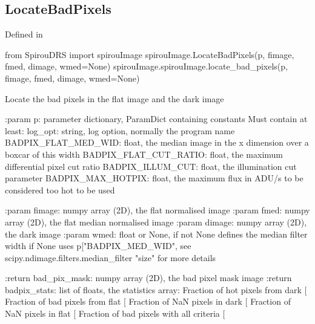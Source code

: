 \noindent\begin{minipage}{\textwidth}
\subsection{LocateBadPixels}

Defined in \spirouImage{}

\begin{pythonbox}
from SpirouDRS import spirouImage
spirouImage.LocateBadPixels(p, fimage, fmed, dimage, wmed=None)
spirouImage.spirouImage.locate_bad_pixels(p, fimage, fmed, dimage, wmed=None)
\end{pythonbox}

\begin{pythondocstring}
Locate the bad pixels in the flat image and the dark image

:param p: parameter dictionary, ParamDict containing constants
    Must contain at least:
            log_opt: string, log option, normally the program name
            BADPIX_FLAT_MED_WID: float, the median image in the x
                                 dimension over a boxcar of this width
            BADPIX_FLAT_CUT_RATIO: float, the maximum differential pixel
                                   cut ratio
            BADPIX_ILLUM_CUT: float, the illumination cut parameter
            BADPIX_MAX_HOTPIX: float, the maximum flux in ADU/s to be
                               considered too hot to be used

:param fimage: numpy array (2D), the flat normalised image
:param fmed: numpy array (2D), the flat median normalised image
:param dimage: numpy array (2D), the dark image
:param wmed: float or None, if not None defines the median filter width
             if None uses p["BADPIX_MED_WID", see
             scipy.ndimage.filters.median_filter "size" for more details

:return bad_pix_mask: numpy array (2D), the bad pixel mask image
:return badpix_stats: list of floats, the statistics array:
                        Fraction of hot pixels from dark [%
                        Fraction of bad pixels from flat [%
                        Fraction of NaN pixels in dark [%
                        Fraction of NaN pixels in flat [%
                        Fraction of bad pixels with all criteria [%
\end{pythondocstring}
\end{minipage}



